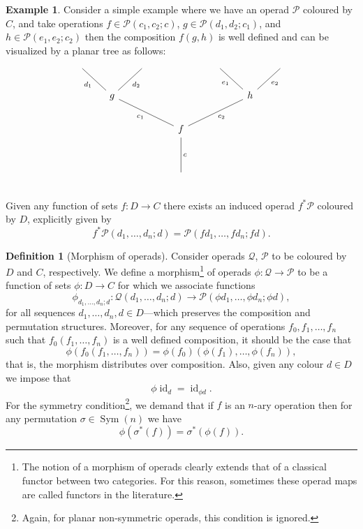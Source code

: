 \documentclass[11pt, reqno]{amsart}
\theoremstyle{definition}
\newtheorem{definition}[theorem]{Definition}
\newtheorem{example}[theorem]{Example}
\DeclareMathOperator{\Id}{id}     %
\DeclareMathOperator{\Sym}{Sym} %
\newcommand{\operad}{\mathcal}
\begin{document}
\begin{example}\label{exp:composing-operations-tree}
Consider a simple example where we have an operad \(\operad P\) coloured by
\(C\), and take operations \(f \in \operad P(c_1, c_2; c)\), \(g \in \operad
P(d_1, d_2; c_1)\), and \(h \in \operad P(e_1, e_2; c_2)\) then the composition
\(f(g, h)\) is well defined and can be visualized by a planar tree as follows:
\[
    \begin{tikzcd}
         \ar[rd, no head, "d_1"'] & & \ar[dl, no head, "d_2"]
        &
        &\ar[rd, no head, "e_1"'] & & \ar[dl, no head, "e_2"]
        \\
          &g \ar[rrd, no head, "c_1"'] &
        &
        & &h \ar[lld, no head, "c_2"] &
        \\
          & &
        &f \ar[dd, "c", no head]
        & & &
        \\
          & &
        &
        &  & &
        \\
          & &
        &\phantom{f}
        & & &
    \end{tikzcd}
\]
\end{example}

Given any function of sets \(f: D \to C\) there exists an induced operad
\(f^{*} \operad P\) coloured by \(D\), explicitly given by
\[
f^{*} \operad P(d_1, \dots, d_n; d) = \operad P(f d_1, \dots, f d_n; f d).
\]

\begin{definition}[Morphism of operads]\label{def:morphism-of-operads}
Consider operads \(\operad Q\), \(\operad P\) to be coloured by \(D\) and
\(C\), respectively. We define a morphism\footnote{The notion of a morphism of
operads clearly extends that of a classical functor between two categories. For
this reason, sometimes these operad maps are called functors in the
literature.} of operads \(\phi: \operad Q \to \operad P\) to be a function of
sets \(\phi: D \to C\) for which we associate functions
\[
    \phi_{d_1, \dots, d_n; d}: \operad Q(d_1, \dots, d_n; d)
    \longrightarrow
    \operad P(\phi d_1, \dots, \phi d_n; \phi d),
\]
for all sequences \(d_1, \dots, d_n, d \in D\)---which preserves the 
composition and permutation structures. Moreover, for any sequence of operations \(f_0,
f_1, \dots, f_n\) such that \(f_0 (f_1, \dots, f_n)\) is a well defined
composition, it should be the case that
\[
    \phi(f_0(f_1, \dots, f_n)) = \phi(f_0)(\phi(f_1), \dots, \phi(f_n)),
\]
that is, the morphism distributes over composition. Also, given any colour \(d
\in D\) we impose that 
\[
    \phi \Id_d = \Id_{\phi d}.
\]
For the symmetry condition\footnote{Again, for planar non-symmetric operads,
this condition is ignored.}, we demand that if \(f\) is an \(n\)-ary operation
then for any permutation \(\sigma \in \Sym(n)\) we have
\[
    \phi(\sigma^*(f)) = \sigma^*(\phi(f)).
\]
\end{definition}
\end{document}
